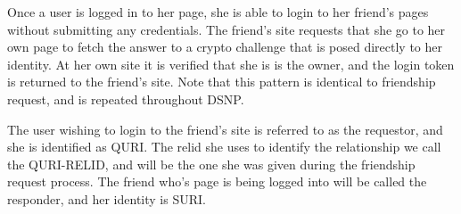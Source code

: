 \documentclass[letterpaper,11pt,oneside]{article}
\begin{document}
Once a user is logged in to her page, she is able to login to her friend's
pages without submitting any credentials. The friend's site requests that she
go to her own page to fetch the answer to a crypto challenge that is posed
directly to her identity. At her own site it is verified that she is is the
owner, and the login token is returned to the friend's site. Note that this
pattern is identical to friendship request, and is repeated throughout DSNP.

The user wishing to login to the friend's site is referred to as the requestor,
and she is identified as QURI. The relid she uses to identify the relationship
we call the QURI-RELID, and will be the one she was given during the friendship
request process. The friend who's page is being logged into will be called the
responder, and her identity is SURI.
\end{document}
